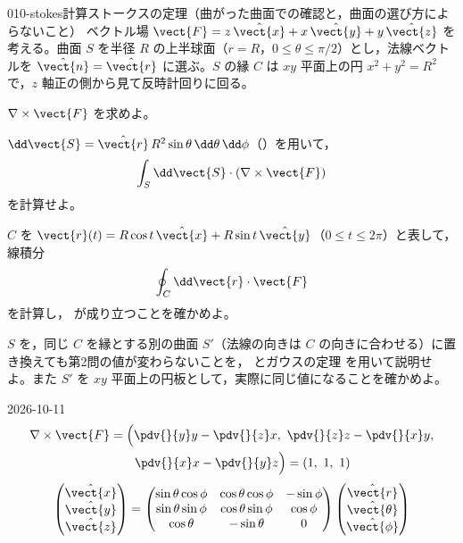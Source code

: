 \documentclass[uplatex,dvipdfmx,a4paper,11pt]{jsarticle}
\begin{document}
\begin{mondai}{010-stokes}{計算}{ストークスの定理（曲がった曲面での確認と，曲面の選び方によらないこと）}
ベクトル場 $\vect{F} = z\,\hat{\vect{x}} + x\,\hat{\vect{y}} + y\,\hat{\vect{z}}$ を考える。曲面 $S$ を半径 $R$ の上半球面（$r = R$，$0 \le \theta \le \pi/2$）とし，法線ベクトルを $\hat{\vect{n}} = \hat{\vect{r}}$ に選ぶ。$S$ の縁 $C$ は $xy$ 平面上の円 $x^2 + y^2 = R^2$ で，$z$ 軸正の側から見て反時計回りに回る。
  \begin{shoumon}
    \item $\nabla\times\vect{F}$ を求めよ。
    \item $\dd\vect{S} = \hat{\vect{r}}\,R^2\sin\theta\,\dd\theta\,\dd\phi$（）を用いて，
    \[ \int_S \dd\vect{S}\cdot(\nabla\times\vect{F}) \]
    を計算せよ。
    \item $C$ を $\vect{r}(t) = R\cos t\,\hat{\vect{x}} + R\sin t\,\hat{\vect{y}}$（$0 \le t \le 2\pi$）と表して，線積分
    \[ \oint_C \dd\vect{r}\cdot\vect{F} \]
    を計算し， が成り立つことを確かめよ。
    \item $S$ を，同じ $C$ を縁とする別の曲面 $S'$（法線の向きは $C$ の向きに合わせる）に置き換えても第2問の値が変わらないことを， とガウスの定理  を用いて説明せよ。また $S'$ を $xy$ 平面上の円板として，実際に同じ値になることを確かめよ。
  \end{shoumon}
\begin{kotaeutsushi}{2026-10-11}
\begin{align*}
\nabla\times\vect{F}&=\Bigl(\pdv{}{y}y-\pdv{}{z}x,\ \pdv{}{z}z-\pdv{}{x}y,\\
&\qquad\pdv{}{x}x-\pdv{}{y}z\Bigr)=(1,\ 1,\ 1)
\end{align*}
\[ \begin{pmatrix}\hat{\vect{x}}\\\hat{\vect{y}}\\\hat{\vect{z}}\end{pmatrix}=\begin{pmatrix}\sin\theta\cos\phi&\cos\theta\cos\phi&-\sin\phi\\\sin\theta\sin\phi&\cos\theta\sin\phi&\cos\phi\\\cos\theta&-\sin\theta&0\end{pmatrix}\begin{pmatrix}\hat{\vect{r}}\\\hat{\vect{\theta}}\\\hat{\vect{\phi}}\end{pmatrix} \]

\end{kotaeutsushi}
\end{mondai}
\end{document}
